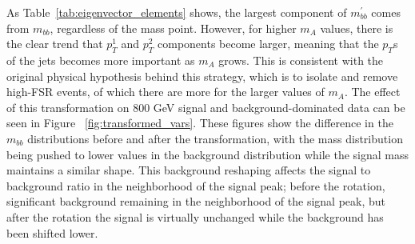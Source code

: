 As Table~\ref{tab:eigenvector_elements} shows, the largest component of
$m_{bb}^{'}$ comes from $m_{bb}$, regardless of the mass point.  However,
for higher $m_A$ values, there is the clear trend that $p_T^1$ and $p_T^2$
components become larger, meaning that the $p_T$s of the jets becomes 
more important as $m_A$ grows.  This is consistent with the original 
physical hypothesis behind this strategy, which is to isolate and remove
high-FSR events, of which there are more for the larger values of $m_A$. 
The effect of this transformation on 800 GeV signal and background-dominated
data can be seen in Figure ~\ref{fig:transformed_vars}.  These figures show
the difference in the $m_{bb}$ distributions %
before and after the transformation,
with the mass distribution being pushed to lower values
in the background distribution while the signal mass maintains a similar shape.  
This background reshaping affects the signal to background ratio in the 
neighborhood of the signal peak; before the rotation,
significant background remaining in the neighborhood of the signal peak, 
but after the rotation the signal is virtually
unchanged while the background has been shifted lower.  


